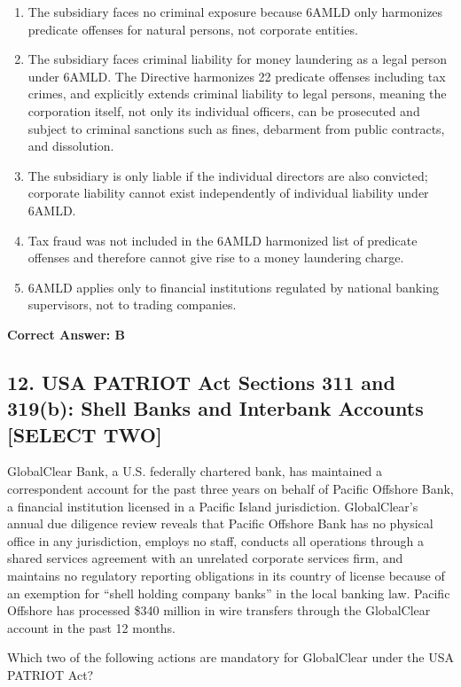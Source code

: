 \documentclass[11pt,a4paper]{article}
\begin{document}
	\begin{enumerate}[label=\Alph*.]
		\item The subsidiary faces no criminal exposure because 6AMLD only harmonizes predicate offenses for natural persons, not corporate entities.
		\item The subsidiary faces criminal liability for money laundering as a legal person under 6AMLD. The Directive harmonizes 22 predicate offenses including tax crimes, and explicitly extends criminal liability to legal persons, meaning the corporation itself, not only its individual officers, can be prosecuted and subject to criminal sanctions such as fines, debarment from public contracts, and dissolution.
		\item The subsidiary is only liable if the individual directors are also convicted; corporate liability cannot exist independently of individual liability under 6AMLD.
		\item Tax fraud was not included in the 6AMLD harmonized list of predicate offenses and therefore cannot give rise to a money laundering charge.
		\item 6AMLD applies only to financial institutions regulated by national banking supervisors, not to trading companies.
	\end{enumerate}
	\textbf{Correct Answer: B}
	
	\subsection{12. USA PATRIOT Act Sections 311 and 319(b): Shell Banks and Interbank Accounts \textnormal{[SELECT TWO]}}
	
	GlobalClear Bank, a U.S. federally chartered bank, has maintained a correspondent account for the past three years on behalf of Pacific Offshore Bank, a financial institution licensed in a Pacific Island jurisdiction. GlobalClear's annual due diligence review reveals that Pacific Offshore Bank has no physical office in any jurisdiction, employs no staff, conducts all operations through a shared services agreement with an unrelated corporate services firm, and maintains no regulatory reporting obligations in its country of license because of an exemption for ``shell holding company banks'' in the local banking law. Pacific Offshore has processed \$340 million in wire transfers through the GlobalClear account in the past 12 months.
	
	Which two of the following actions are mandatory for GlobalClear under the USA PATRIOT Act?
	
\end{document}
